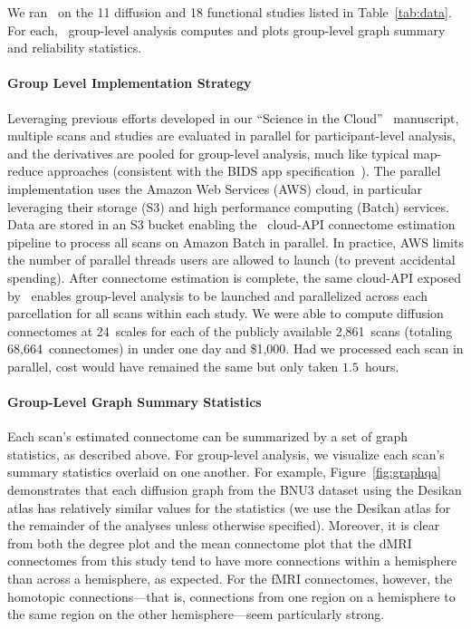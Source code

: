 \documentclass[11pt]{article}
\begin{document}
\begin{multicols}{2}
We ran \ndmg~on the 11 diffusion and 18 functional studies listed in 
Table~\ref{tab:data}.
For each, \ndmg~group-level analysis computes and plots group-level graph summary and reliability statistics. 



\paragraph{Group Level Implementation Strategy}

Leveraging previous efforts developed in our  ``Science in the Cloud''~\cite{sic} manuscript, multiple scans and studies are evaluated in parallel for participant-level analysis, and the derivatives are pooled for group-level analysis, much like typical map-reduce approaches (consistent with the BIDS app specification~\cite{bidsapps}). The parallel  implementation uses the Amazon Web Services (AWS) cloud, in particular leveraging their storage (S3) and high performance computing (Batch) services. Data are stored in an S3 bucket enabling  the \ndmg~cloud-API connectome estimation pipeline to process all scans on Amazon Batch in parallel. In practice,  AWS limits the number of parallel threads users are allowed to launch (to prevent accidental spending). After connectome estimation is complete, the same cloud-API exposed by \ndmg~enables group-level analysis to be launched and parallelized across each parcellation for all scans within each study.
% 
% 
We were able to compute diffusion connectomes at 24~scales for each of the publicly available 2,861~scans (totaling 68,664~connectomes) in under one day and \$1,000. Had we processed each scan in parallel, cost would have remained the same but only taken $1.5$~hours.

\paragraph{Group-Level Graph Summary Statistics}

Each scan's estimated connectome can be summarized by a set of graph statistics, as described above. For group-level analysis, we visualize each scan's summary statistics overlaid on one another. For example, Figure~\ref{fig:graphqa} demonstrates that each diffusion graph from the BNU3 dataset using the Desikan atlas has relatively similar values for the statistics (we use the Desikan atlas for the remainder of the analyses unless otherwise specified). Moreover, it is clear from both the degree plot and the mean connectome plot that the dMRI connectomes from this study tend to have more connections within a hemisphere than across a hemisphere, as expected. For the fMRI connectomes, however, the homotopic connections---that is, connections from one region on a hemisphere to the same region on the other hemisphere---seem particularly strong.
 

\end{multicols}
\end{document}
